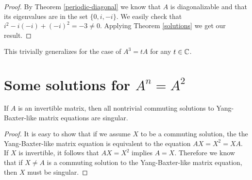 \documentclass{article}
\begin{document}
\begin{proof}
  By Theorem \ref{periodic-diagonal} we know that $A$ is diagonalizable and that its eigenvalues are in the set $\{0, i, - i\}$.
  We easily check that $i^2 - i (- i) + (- i)^2 = -3 \neq 0$.
  Applying Theorem \ref{solutions} we get our result.
\end{proof}

\begin{remark}
This trivially generalizes for the case of $A^3 = t A$ for any $t \in \mathbb{C}$.
\end{remark}

\section{Some solutions for $A^n = A^2$}
\begin{theorem} \label{singular}
  If $A$ is an invertible matrix, then all nontrivial commuting solutions to Yang-Baxter-like matrix equations are singular.
\end{theorem}

\begin{proof}
  It is easy to show that if we assume $X$ to be a commuting solution, the the Yang-Baxter-like matrix equation is equivalent to the equation $AX = X^2 = XA$.
  If $X$ is invertible, it follows that $AX = X^2$ implies $A = X$.
  Therefore we know that if $X \neq A$ is a commuting solution to the Yang-Baxter-like matrix equation, then $X$ must be singular.
\end{proof}
\end{document}
